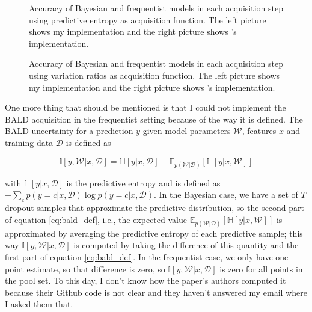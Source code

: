 \begin{figure}[H]
  \centering
  \hfill
  \caption{Accuracy of Bayesian and frequentist models in each acquisition step using predictive entropy as acquisition function. The left picture shows my implementation and the right picture shows \citeauthor{Gal2016Active}'s implementation.}
  \label{fig:mnist_pred_entropy_AL}
\end{figure}


\begin{figure}[H]
  \centering
  \hfill
  \caption{Accuracy of Bayesian and frequentist models in each acquisition step using variation ratios as acquisition function. The left picture shows my implementation and the right picture shows \citeauthor{Gal2016Active}'s implementation.}
  \label{fig:mnist_var_ratios_AL}
\end{figure}

One more thing that should be mentioned is that I could not implement the BALD acquisition in the frequentist setting because of the way it is defined. The BALD uncertainty for a prediction $y$ given model parameters $\mathcal{W}$, features $x$ and training data $\mathcal{D}$ is defined as

\begin{equation}
	\label{eq:bald_def}
	\mathbb{I}[y, \mathcal{W} | x, \mathcal{D}] = \mathbb{H}[y | x, \mathcal{D}] - \mathbb{E}_{p(\mathcal{W} | \mathcal{D})}[\mathbb{H}[y | x, \mathcal{W}]]
\end{equation}

with $\mathbb{H}[y | x, \mathcal{D}]$ is the predictive entropy and is defined as $-\sum_c p(y = c | x, \mathcal{D}) \log p(y = c | x, \mathcal{D})$. In the Bayesian case, we have a set of $T$ dropout samples that approximate the predictive distribution, so the second part of equation \ref{eq:bald_def}, i.e., the expected value $\mathbb{E}_{p(\mathcal{W} | \mathcal{D})}[\mathbb{H}[y | x, \mathcal{W}]]$ is approximated by averaging the predictive entropy of each predictive sample; this way $\mathbb{I}[y, \mathcal{W} | x, \mathcal{D}]$ is computed by taking the difference of this quantity and the first part of equation \ref{eq:bald_def}. In the frequentist case, we only have one point estimate, so that difference is zero, so $\mathbb{I}[y, \mathcal{W} | x, \mathcal{D}]$ is zero for all points in the pool set. To this day, I don't know how the paper's authors computed it because their Github code is not clear and they haven't answered my email where I asked them that.

